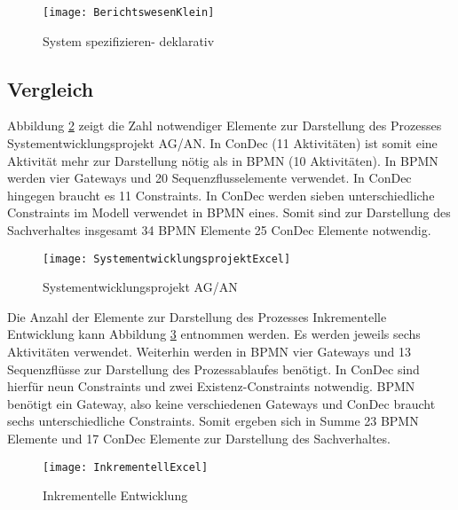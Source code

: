 \begin{figure}[!htbp]
\begin{center}
  \texttt{[image: BerichtswesenKlein]} %
  \caption{System spezifizieren- deklarativ}
  \label{fig:BerichtswesenKlein}
\end{center}
\end{figure}

\clearpage

\subsection{Vergleich}


Abbildung \ref{fig:SystementwicklungsprojektExcel} zeigt die Zahl notwendiger Elemente zur Darstellung des Prozesses Systementwicklungsprojekt AG/AN. In ConDec (11 Aktivitäten)  ist somit eine Aktivität mehr zur Darstellung nötig als in BPMN (10 Aktivitäten). In BPMN werden vier Gateways und 20 Sequenzflusselemente verwendet. In ConDec hingegen braucht es 11 Constraints. In ConDec werden sieben unterschiedliche Constraints im Modell verwendet in BPMN eines. Somit sind zur Darstellung des Sachverhaltes insgesamt 34 BPMN Elemente 25 ConDec Elemente notwendig.\newline

\begin{figure}[!htbp]
\begin{center}
  \texttt{[image: SystementwicklungsprojektExcel]} %
  \caption{Systementwicklungsprojekt AG/AN}
  \label{fig:SystementwicklungsprojektExcel}
\end{center}
\end{figure}

Die Anzahl der Elemente zur Darstellung des Prozesses Inkrementelle Entwicklung kann Abbildung \ref{fig:InkrementellExcel} entnommen werden. Es werden jeweils sechs Aktivitäten verwendet. Weiterhin werden in BPMN vier Gateways und 13 Sequenzflüsse zur Darstellung des Prozessablaufes benötigt. In ConDec sind hierfür neun Constraints und zwei Existenz-Constraints notwendig. BPMN benötigt ein Gateway, also keine verschiedenen Gateways und ConDec braucht sechs unterschiedliche Constraints. Somit ergeben sich in Summe 23 BPMN Elemente und 17 ConDec Elemente zur Darstellung des Sachverhaltes. \newline

\begin{figure}[!htbp]
\begin{center}
  \texttt{[image: InkrementellExcel]} %
  \caption{Inkrementelle Entwicklung}
  \label{fig:InkrementellExcel}
\end{center}
\end{figure}

